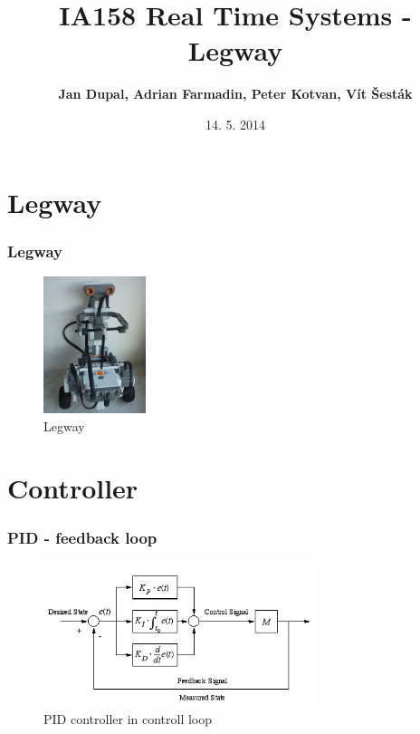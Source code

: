 \documentclass{beamer}
\title[Legway]{IA158 Real Time Systems - Legway} %
\author{\textbf{Jan Dupal, Adrian Farmadin, Peter Kotvan, Vít Šesták}}
\institute[FI MUNI] %
{
FI MUNI \\ %
\medskip
}
\date{14. 5. 2014} %
\begin{document}
\begin{frame}
\titlepage %
\end{frame}


\section{Legway}

\begin{frame}
\frametitle{Legway}

\begin{figure}[h]
    \centering
    \includegraphics[height=4cm, angle=270]{legway}
    \caption{Legway}
    \label{fig:legway}
\end{figure}

\end{frame}

\section{Controller}

\begin{frame}
\frametitle{PID - feedback loop}

\begin{figure}[h]
    \centering
    \includegraphics[width=8cm]{pid}
    \caption{PID controller in controll loop}
    \label{fig:pid}
\end{figure}

\end{frame}
\end{document}
